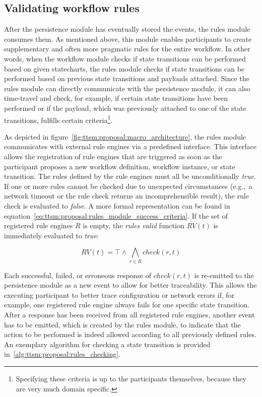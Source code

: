 \subsection{Validating workflow rules}
\label{sec:ttsm:proposal:validating_workflow_rules}
After the persistence module has eventually stored the events, the rules module consumes them. As mentioned above, this module enables participants to create supplementary and often more pragmatic rules for the entire workflow. In other words, when the workflow module checks if state transitions can be performed based on given statecharts, the rules module checks if state transitions can be performed based on previous state transitions and payloads attached. Since the rules module can directly communicate with the persistence module, it can also time-travel and check, for example, if certain state transitions have been performed or if the payload, which was previously attached to one of the state transitions, fulfills certain criteria\footnote{Specifying these criteria is up to the participants themselves, because they are very much domain specific.}.

As depicted in figure~\ref{fig:ttsm:proposal:macro_architecture}, the rules module communicates with external rule engines via a predefined interface. This interface allows the registration of rule engines that are triggered as soon as the participant proposes a new workflow definition, workflow instance, or state transition. The rules defined by the rule engines must all be unconditionally \textit{true}. If one or more rules cannot be checked due to unexpected circumstances (e.g.,\ a network timeout or the rule check returns an incomprehensible result), the rule check is evaluated to \textit{false}. A more formal representation can be found in equation~\ref{eq:ttsm:proposal:rules_module_success_criteria}. If the set of registered rule engines $R$ is empty, the \textit{rules valid} function $RV(t)$ is immediately evaluated to \textit{true}:

\begin{equation}
\label{eq:ttsm:proposal:rules_module_success_criteria}
RV(t) = \top \wedge \bigwedge_{r \in R} check(r,t)
\end{equation}

Each successful, failed, or erroneous response of $check(r,t)$ is re-emitted to the persistence module as a new event to allow for better traceability. This allows the executing participant to better trace configuration or network errors if, for example, one registered rule engine always fails for one specific state transition. After a response has been received from all registered rule engines, another event has to be emitted, which is created by the rules module, to indicate that the action to be performed is indeed allowed according to all previously defined rules. An exemplary algorithm for checking a state transition is provided in~\ref{alg:ttsm:proposal:rules_checking}.

